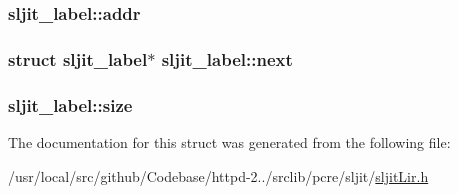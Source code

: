 \subsubsection[{\texorpdfstring{addr}{addr}}]{ sljit\+\_\+label\+::addr}\hypertarget{structsljit__label_ae3be800e1480f72427c3415eb9576367}{}\label{structsljit__label_ae3be800e1480f72427c3415eb9576367}
\subsubsection[{\texorpdfstring{next}{next}}]{\setlength{\rightskip}{0pt plus 5cm}struct {\bf sljit\+\_\+label}$\ast$ sljit\+\_\+label\+::next}\hypertarget{structsljit__label_a81dd53cfdcbbdd1fdd72b1acceff0a97}{}\label{structsljit__label_a81dd53cfdcbbdd1fdd72b1acceff0a97}
\subsubsection[{\texorpdfstring{size}{size}}]{ sljit\+\_\+label\+::size}\hypertarget{structsljit__label_ad654a12872ef3758a0435bb03cc5c4fa}{}\label{structsljit__label_ad654a12872ef3758a0435bb03cc5c4fa}


The documentation for this struct was generated from the following file\+:\begin{DoxyCompactItemize}
\item 
/usr/local/src/github/\+Codebase/httpd-\/2../srclib/pcre/sljit/\hyperlink{sljitLir_8h}{sljit\+Lir.\+h}\end{DoxyCompactItemize}
